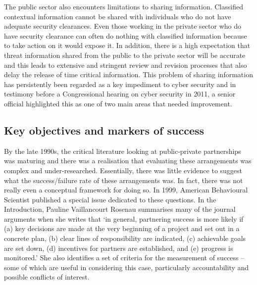 \documentclass[a4paper,11pt]{article}
\begin{document}
The public sector also encounters limitations to sharing
information. Classified contextual information cannot be shared with
individuals who do not have adequate security clearances. Even those
working in the private sector who do have security clearance can often
do nothing with classified information because to take action on it
would expose it. In addition, there is a high expectation that threat
information shared from the public to the private sector will be
accurate and this leads to extensive and stringent review and revision
processes that also delay the release of time critical information.
This problem of sharing information has persistently been regarded as
a key impediment to cyber security and in testimony before a
Congressional hearing on cyber security in 2011, a senior official
highlighted this as one of two main areas that needed improvement. 

\subsection{Key objectives and markers of success}

By the late 1990s, the critical literature looking at public-private
partnerships was maturing and there was a realisation that evaluating
these arrangements was complex and under-researched. Essentially,
there was little evidence to suggest what the success/failure rate of
these arrangements was. In fact, there was not really even a
conceptual framework for doing so. In 1999, American Behavioural
Scientist published a special issue dedicated to these questions. In
the Introduction, Pauline Vaillancourt Rosenau summarises many of the
journal arguments when she writes that `in general, partnering success
is more likely if (a) key decisions are made at the very beginning of
a project and set out in a concrete plan, (b) clear lines of
responsibility are indicated, (c) achievable goals are set down, (d)
incentives for partners are established, and (e) progress is
monitored.' She also identifies a set of criteria for the measurement
of success -- some of which are useful in considering this case,
particularly accountability and possible conflicts of interest.   
\end{document}
